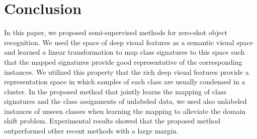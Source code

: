 \documentclass[10pt,twocolumn,letterpaper]{article}
\begin{document}
\section{Conclusion} \label{conclusion}
In this paper, we proposed semi-supervised methods for zero-shot object recognition.
We used the space of deep visual features as a semantic visual space and learned a linear transformation to map class signatures to this
space such that the mapped signatures provide good representative of the corresponding instances.
We utilized this property that the rich deep visual features provide a representation space in which samples of each class
are usually condensed in a cluster. In the proposed method that jointly learns the mapping of class signatures and the class assignments of unlabeled data,
we used also unlabeled instances of unseen classes when learning the mapping to alleviate the domain shift problem.
Experimental results showed that the proposed method outperformed other recent methods with a large margin.

{\small


}
\end{document}
